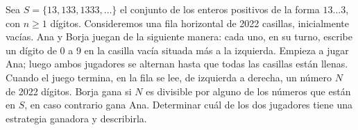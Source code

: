 Sea $S=\{13,133,1333,\dots\}$ el conjunto de los enteros positivos de la forma $13\dots3$, con $n\geq 1$ dígitos. Consideremos una fila horizontal de 2022 casillas, inicialmente vacías. Ana y Borja juegan de la siguiente manera: cada uno, en su turno, escribe un dígito de 0 a 9 en la casilla vacía situada más a la izquierda. Empieza a jugar Ana; luego ambos jugadores se alternan hasta que todas las casillas están llenas. Cuando el juego termina, en la fila se lee, de izquierda a derecha, un número $N$ de 2022 dígitos. Borja gana si $N$ es divisible por alguno de los números que están en $S$, en caso contrario gana Ana. Determinar cuál de los dos jugadores tiene una estrategia ganadora y describirla.